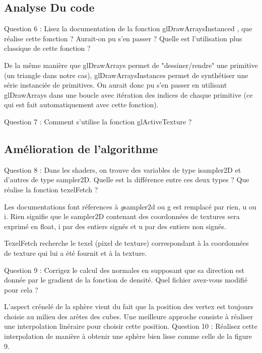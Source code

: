\documentclass[a4paper]{article}
\begin{document}
\subsection{Analyse Du code}
Question 6 : Lisez la documentation de la fonction glDrawArraysInstanced , que réalise cette fonction ? Aurait-on pu s’en
passer ? Quelle est l’utilisation plus classique de cette fonction ?

De la même manière que glDrawArrays permet de "dessiner/rendre" une primitive (un triangle dans notre cas), glDrawArraysInstances permet de synthétiser une série instanciée de primitives. On aurait donc pu s'en passer en utilisant glDrawArrays dans une boucle avec itération des indices de chaque primitive (ce qui est fait automatiquement avec cette fonction). 

Question 7 : Comment s’utilise la fonction glActiveTexture ? 


\subsection{Amélioration de l'algorithme}

Question 8 : Dans les shaders, on trouve des variables de type isampler2D et d’autres de type sampler2D. Quelle est la
différence entre ces deux types ?  Que réalise la fonction texelFetch ?

Les documentations font réferences à \textit{g}sampler2d ou g est remplacé par rien, u ou i. Rien signifie que le sampler2D contenant des coordonnées de textures sera exprimé en float, i par des entiers signés et u par des entiers non signés. 

TexelFetch recherche le texel (pixel de texture) correspondant à la coordonnées de texture qui lui a été fournit et à la texture. 

Question 9 : Corrigez le calcul des normales en supposant que sa direction est donnée par le gradient de la fonction de
densité. Quel fichier avez-vous modifié pour cela ?



L’aspect crénelé de la sphère vient du fait que la position des vertex est toujours choisie au milieu des arètes des cubes.
Une meilleure approche consiste à réaliser une interpolation linéraire pour choisir cette position.
Question 10 : Réalisez cette interpolation de manière à obtenir une sphère bien lisse comme celle de la figure 9.
\end{document}
